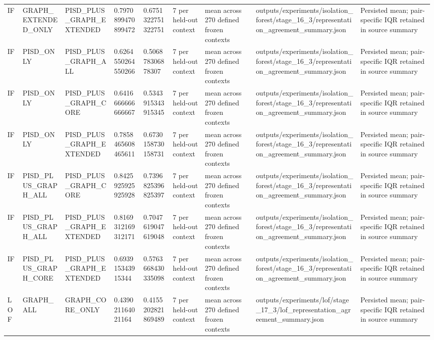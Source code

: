 \begin{longtable}{lllllllll}
IF & GRAPH\_EXTENDED\_ONLY & PISD\_PLUS\_GRAPH\_EXTENDED & 0.7970899470899472 & 0.6751322751322751 & 7 per held-out context & mean across 270 defined frozen contexts & outputs/experiments/isolation\_forest/stage\_16\_3/representation\_agreement\_summary.json & Persisted mean; pair-specific IQR retained in source summary \\
IF & PISD\_ONLY & PISD\_PLUS\_GRAPH\_ALL & 0.6264550264550266 & 0.506878306878307 & 7 per held-out context & mean across 270 defined frozen contexts & outputs/experiments/isolation\_forest/stage\_16\_3/representation\_agreement\_summary.json & Persisted mean; pair-specific IQR retained in source summary \\
IF & PISD\_ONLY & PISD\_PLUS\_GRAPH\_CORE & 0.6416666666666667 & 0.5343915343915345 & 7 per held-out context & mean across 270 defined frozen contexts & outputs/experiments/isolation\_forest/stage\_16\_3/representation\_agreement\_summary.json & Persisted mean; pair-specific IQR retained in source summary \\
IF & PISD\_ONLY & PISD\_PLUS\_GRAPH\_EXTENDED & 0.7858465608465611 & 0.6730158730158731 & 7 per held-out context & mean across 270 defined frozen contexts & outputs/experiments/isolation\_forest/stage\_16\_3/representation\_agreement\_summary.json & Persisted mean; pair-specific IQR retained in source summary \\
IF & PISD\_PLUS\_GRAPH\_ALL & PISD\_PLUS\_GRAPH\_CORE & 0.8425925925925928 & 0.7396825396825397 & 7 per held-out context & mean across 270 defined frozen contexts & outputs/experiments/isolation\_forest/stage\_16\_3/representation\_agreement\_summary.json & Persisted mean; pair-specific IQR retained in source summary \\
IF & PISD\_PLUS\_GRAPH\_ALL & PISD\_PLUS\_GRAPH\_EXTENDED & 0.8169312169312171 & 0.7047619047619048 & 7 per held-out context & mean across 270 defined frozen contexts & outputs/experiments/isolation\_forest/stage\_16\_3/representation\_agreement\_summary.json & Persisted mean; pair-specific IQR retained in source summary \\
IF & PISD\_PLUS\_GRAPH\_CORE & PISD\_PLUS\_GRAPH\_EXTENDED & 0.693915343915344 & 0.5763668430335098 & 7 per held-out context & mean across 270 defined frozen contexts & outputs/experiments/isolation\_forest/stage\_16\_3/representation\_agreement\_summary.json & Persisted mean; pair-specific IQR retained in source summary \\
LOF & GRAPH\_ALL & GRAPH\_CORE\_ONLY & 0.439021164021164 & 0.4155202821869489 & 7 per held-out context & mean across 270 defined frozen contexts & outputs/experiments/lof/stage\_17\_3/lof\_representation\_agreement\_summary.json & Persisted mean; pair-specific IQR retained in source summary \\

\end{longtable}
